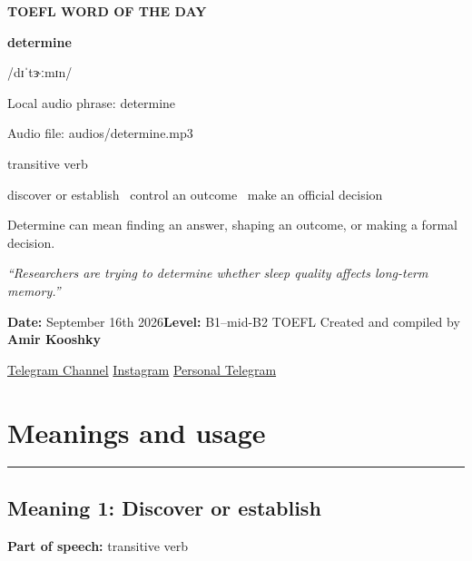 \documentclass[11pt]{article}
\newcommand{\sectionrule}{\par\vspace{-0.5em}\noindent\textcolor{Accent}{\rule{\linewidth}{0.6pt}}\par}
\begin{document}
\begin{center}
{\sffamily\bfseries\color{Accent} TOEFL WORD OF THE DAY\par}
\vspace{8mm}
{\fontsize{42}{48}\selectfont\bfseries determine\par}
\vspace{2mm}
{\Large\sffamily\color{Accent} /dɪˈtɝːmɪn/\par}
\vspace{2mm}
{\small\sffamily Local audio phrase: determine\par}
{\small\sffamily Audio file: audios/determine.mp3\par}
\vspace{2mm}
{\large\sffamily\color{Muted} transitive verb\par}
\vspace{5mm}
{\sffamily discover or establish \textbullet\ control an outcome \textbullet\ make an official decision\par}
\vspace{6mm}
{\large Determine can mean finding an answer, shaping an outcome, or making a formal decision.\par}
\vspace{6mm}
\begin{minipage}{0.84\textwidth}
\itshape “Researchers are trying to determine whether sleep quality affects long-term memory.”
\end{minipage}\par
\vspace{10mm}
\textbf{Date:} September 16th 2026\quad\textbullet\quad \textbf{Level:} B1--mid-B2 TOEFL
\vfill
Created and compiled by \textbf{Amir Kooshky}\par
\vspace{2mm}
\href{https://t.me/KooshkyTOEFL}{Telegram Channel}\quad\textbullet\quad
\href{https://www.instagram.com/kooshkytoefl}{Instagram}\quad\textbullet\quad
\href{https://t.me/KooshkyTOEFL\_pv}{Personal Telegram}
\end{center}
\newpage
\tableofcontents
\newpage

\section{Meanings and usage}
\sectionrule
\subsection{Meaning 1: Discover or establish}
\textbf{Part of speech:} transitive verb
\end{document}
